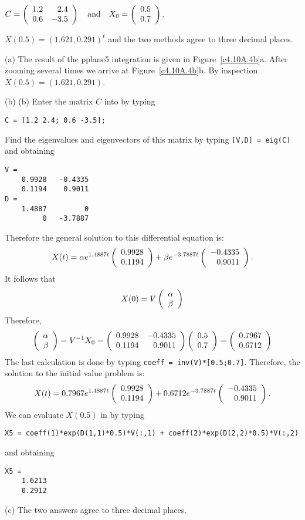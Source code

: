 \documentclass{ximera}
\begin{document}
\begin{exercise}  \label{c4.10A.4b}  
$C = \left(\begin{array}{rr} 1.2 & 2.4\\ 0.6 &-3.5\end{array}\right) \quad\mbox{and}\quad X_0=\left(\begin{array}{r} 0.5 \\ 0.7\end{array}\right)$.

\begin{solution}
\ans $X(0.5) = (1.621,0.291)^t$ and the two methods agree to three 
decimal places.

\soln (a) The result of the {\sf pplane5} integration is given in 
Figure~\ref{c4.10A.4b}a. After zooming several times we arrive at
Figure~\ref{c4.10A.4b}b.  By inspection $X(0.5)=(1.621,0.291)$.

(b) (b)  Enter the matrix $C$ into \Matlab by typing
\begin{verbatim}
C = [1.2 2.4; 0.6 -3.5];
\end{verbatim}
Find the eigenvalues and eigenvectors of this matrix by typing {\tt [V,D] = eig(C)}
and obtaining
\begin{verbatim}
V =
    0.9928   -0.4335
    0.1194    0.9011
D =
    1.4887         0
         0   -3.7887
\end{verbatim}
Therefore the general solution to this differential equation is:
\[
X(t) = \alpha e^{1.4887 t}\left(\begin{array}{r} 0.9928 \\ 0.1194\end{array}\right) +
\beta e^{-3.7887 t}\left(\begin{array}{r} -0.4335 \\ 0.9011\end{array}\right).
\]
It follows that 
\[
X(0) = V \left(\begin{array}{r} \alpha \\ \beta\end{array}\right)
\]
Therefore,
\[
\left(\begin{array}{r} \alpha \\ \beta\end{array}\right) = V^{-1} X_0 = 
\left(\begin{array}{rr} 0.9928 & -0.4335\\ 0.1194 &0.9011\end{array}\right)\left(\begin{array}{r} 0.5 \\ 0.7\end{array}\right) = \left(\begin{array}{r} 0.7967 \\ 0.6712\end{array}\right)
\]
The last calculation is done by typing {\tt coeff = inv(V)*[0.5;0.7]}. 
Therefore, the solution to the initial value problem is:
\[
X(t) = 0.7967e^{1.4887 t}\left(\begin{array}{r} 0.9928 \\ 0.1194\end{array}\right) +
0.6712e^{-3.7887 t}\left(\begin{array}{r} -0.4335 \\ 0.9011\end{array}\right).
\]
We can evaluate $X(0.5)$ in \Matlab by typing
\begin{verbatim}
X5 = coeff(1)*exp(D(1,1)*0.5)*V(:,1) + coeff(2)*exp(D(2,2)*0.5)*V(:,2)
\end{verbatim}
and obtaining
\begin{verbatim}
X5 =
    1.6213
    0.2912
\end{verbatim}

(c)  The two answers agree to three decimal places.


\begin{figure}[htb]
                       \centerline{%
                       }
\end{figure}



\end{solution}
\end{exercise}
\end{document}
